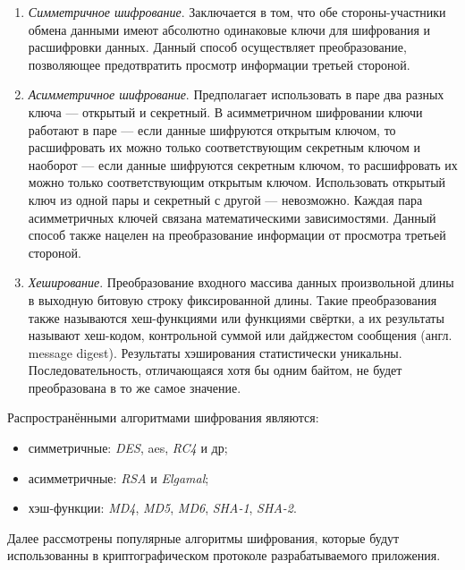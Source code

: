 \begin{enumerate}
	\item \emph{Симметричное шифрование}. Заключается в том, что обе стороны-участники обмена данными имеют абсолютно одинаковые ключи для шифрования и расшифровки данных. Данный способ осуществляет преобразование, позволяющее предотвратить просмотр информации третьей стороной.
	\item \emph{Асимметричное шифрование}. Предполагает использовать в паре два разных ключа — открытый и секретный. В асимметричном шифровании ключи работают в паре — если данные шифруются открытым ключом, то расшифровать их можно только соответствующим секретным ключом и наоборот — если данные шифруются секретным ключом, то расшифровать их можно только соответствующим открытым ключом. Использовать открытый ключ из одной пары и секретный с другой — невозможно. Каждая пара асимметричных ключей связана математическими зависимостями. Данный способ также нацелен на преобразование информации от просмотра третьей стороной.
	\item \emph{Хеширование}. Преобразование входного массива данных произвольной длины в выходную битовую строку фиксированной длины. Такие преобразования также называются хеш-функциями или функциями свёртки, а их результаты называют хеш-кодом, контрольной суммой или дайджестом сообщения (англ. message digest). Результаты хэширования статистически уникальны. Последовательность, отличающаяся хотя бы одним байтом, не будет преобразована в то же самое значение.
\end{enumerate}

Распространёнными алгоритмами шифрования являются:

\begin{itemize}
	\item симметричные: \textit{DES}, \gls{aes}, \textit{RC4} и др;
	\item асимметричные: \textit{RSA} и \textit{Elgamal};
	\item хэш-функции: \textit{MD4}, \textit{MD5}, \textit{MD6}, \textit{SHA-1}, \textit{SHA-2}.
\end{itemize}

Далее рассмотрены популярные алгоритмы шифрования, которые будут использованны в криптографическом протоколе разрабатываемого приложения.